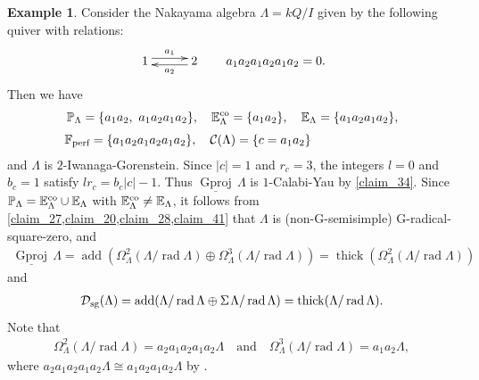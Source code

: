 \documentclass[12pt]{amsart}
\numberwithin{equation}{subsection}
\theoremstyle{plain}
\theoremstyle{definition}
\newtheorem{example}[theorem]{Example}
\newcommand{\rad}{\operatorname{rad}}
\newcommand{\add}{\operatorname{add}}
\newcommand{\sGproj}{\underline{\operatorname{Gproj}}\,}
\newcommand{\thick}{\operatorname{thick}}
\newcommand{\Fp}{\mathbb{F}_\text{perf}}
\renewcommand{\P}{\operatorname{\mathbb{P}}\nolimits}
\renewcommand{\L}{\Lambda}
\newcommand{\D}{\mathcal{D}}
\newcommand{\C}{\mathcal{C}}
\newcommand{\Eco}{\mathbb{E}^{\rm co}}
\newcommand{\E}{\mathbb{E}}
\begin{document}
\begin{example}\label{example_3}
Consider the Nakayama algebra $\L=kQ/I$ given by the following quiver with relations:
\begin{align}
    \xymatrix@C=10mm{
    1 \ar@<0.6ex>[r]^-{a_1} & 2 \ar@<0.6ex>[l]^-{a_2} 
    }
    \qquad a_1 a_2 a_1 a_2 a_1 a_2 =0. 
\end{align}
Then we have 
\begin{align}
    & \P_\L=\{ a_1 a_2, \  a_1 a_2 a_1 a_2\}, \quad
    \Eco_\L=\{ a_1 a_2\},\quad
    \E_\L=\{ a_1 a_2 a_1 a_2\},\\[1mm]
    &\Fp=\{a_1 a_2 a_1 a_2 a_1 a_2\},\quad
    \C(\L)=\{ c = a_1 a_2\}
\end{align}
and $\L$ is $2$-Iwanaga-Gorenstein.
Since $|c| =1$ and $r_{c}=3$, the integers $l=0$ and $b_{c}=1$ satisfy $l r_{c} = b_{c} |c| -1$.
Thus $\sGproj\L$ is $1$-Calabi-Yau by \cref{claim_34}. 
Since $\P_\L = \Eco_\L\cup\E_\L$ with $\Eco_\L\neq\E_\L$, it follows from \cref{claim_27,claim_20,claim_28,claim_41} that $\L$ is (non-G-semisimple) G-radical-square-zero, and 
\begin{align}
\sGproj\L=\add\left(\Omega_\L^{2}(\L/\rad\L) \oplus \Omega_\L^{3}(\L/\rad\L)\right)=\thick(\Omega_\L^{2}(\L/\rad\L))
\end{align}
and
\begin{align}
 \D_{\rm sg}(\L)=\add(\L/\rad\L\oplus\Sigma\hspace{1pt}\L/\rad\L)=\thick(\L/\rad\L).
\end{align}
Note that 
\begin{align}
\Omega_\L^{2}(\L/\rad\L) = a_2 a_1 a_2 a_1 a_2\L  
\quad\text{and}\quad
\Omega_\L^{3}(\L/\rad\L) = a_1 a_2\L,
\end{align}
where $a_2 a_1 a_2 a_1 a_2\L \cong a_1 a_2 a_1 a_2\L$ by \cite[Proposition 4.6]{Chen-Shen-Zhou_2018}. 
\end{example}










 
\appendix 
\end{document}
